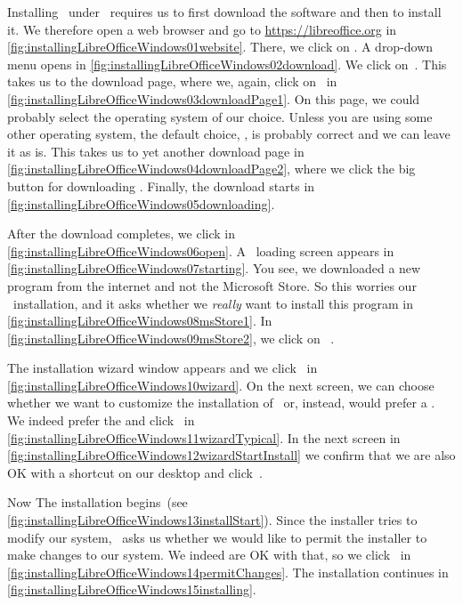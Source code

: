 %
%
Installing \libreoffice\ under \microsoftWindows\ requires us to first download the software and then to install it.
We therefore open a web browser and go to \url{https://libreoffice.org} in \cref{fig:installingLibreOfficeWindows01website}.
There, we click on .
A drop-down menu opens in \cref{fig:installingLibreOfficeWindows02download}.
We click on~.
This takes us to the download page, where we, again, click on~ in \cref{fig:installingLibreOfficeWindows03downloadPage1}.
On this page, we could probably select the operating system of our choice.
Unless you are using some other operating system, the default choice, , is probably correct and we can leave it as is.
This takes us to yet another download page in \cref{fig:installingLibreOfficeWindows04downloadPage2}, where we click the big button for downloading \libreoffice.
Finally, the download starts in \cref{fig:installingLibreOfficeWindows05downloading}.

After the download completes, we click  in \cref{fig:installingLibreOfficeWindows06open}.
A \microsoftWindows\ loading screen appears in \cref{fig:installingLibreOfficeWindows07starting}.
You see, we downloaded a new program from the internet and not the Microsoft Store.
So this worries our \microsoftWindows\ installation, and it asks whether we \emph{really} want to install this program in \cref{fig:installingLibreOfficeWindows08msStore1}.
In \cref{fig:installingLibreOfficeWindows09msStore2}, we click on ~.

The installation wizard window appears and we click~ in \cref{fig:installingLibreOfficeWindows10wizard}.
On the next screen, we can choose whether we want to customize the installation of \libreoffice\ or, instead, would prefer a .
We indeed prefer the  and click~ in \cref{fig:installingLibreOfficeWindows11wizardTypical}.
In the next screen in \cref{fig:installingLibreOfficeWindows12wizardStartInstall} we confirm that we are also OK with a shortcut on our desktop and click~.

Now The installation begins~(see \cref{fig:installingLibreOfficeWindows13installStart}).
Since the installer tries to modify our system, \microsoftWindows\ asks us whether we would like to permit the installer to make changes to our system.
We indeed are OK with that, so we click~ in \cref{fig:installingLibreOfficeWindows14permitChanges}.
The installation continues in \cref{fig:installingLibreOfficeWindows15installing}.

